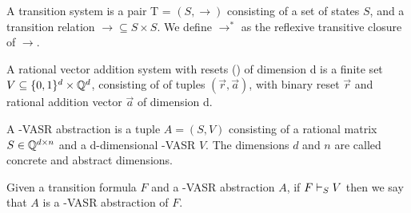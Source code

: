 \begin{mydef}
A transition system is a pair T = $(S, \rightarrow)$ consisting of a set of states $S$, and a transition relation $\rightarrow \subseteq S \times S$. We define $\rightarrow^*$ as the reflexive transitive closure of $\rightarrow$.
\end{mydef}

\begin{mydef}
A rational vector addition system with resets (\qvasr) of dimension d is a finite set $V \subseteq \{0, 1\}^d \times \mathbb{Q}^d$, consisting of of tuples $(\vec{r}, \vec{a})$, with binary reset $\vec{r}$ and rational addition vector $\vec{a}$ of dimension d.
\end{mydef}

\begin{mydef}
A \Q-VASR abstraction is a tuple $A = (S, V)$ consisting of a rational matrix $S \in \mathbb{Q}^{d \times n}$ and a d-dimensional \Q-VASR $V$. The dimensions $d$ and $n$ are called concrete and abstract dimensions.
\end{mydef}

Given a transition formula $F$ and a \Q-VASR abstraction $A$, if $F \vdash_{S} V$ then we say that $A$ is a \Q-VASR abstraction of $F$.